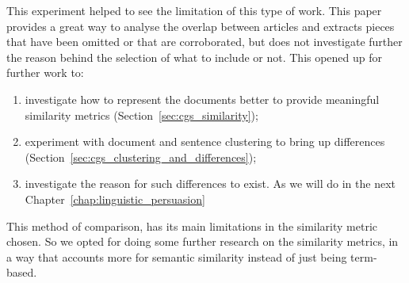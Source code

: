 
This experiment helped to see the limitation of this type of work.%
This paper provides a great way to analyse the overlap between articles and extracts pieces that have been omitted or that are corroborated, but does not investigate further the reason behind the selection of what to include or not.
This opened up for further work to:
\begin{enumerate}
    \item investigate how to represent the documents better to provide meaningful similarity metrics (Section~\ref{sec:cgs_similarity});
    \item experiment with document and sentence clustering to bring up differences (Section~\ref{sec:cgs_clustering_and_differences});
    \item investigate the reason for such differences to exist. As we will do in the next Chapter~\ref{chap:linguistic_persuasion}
\end{enumerate}

This method of comparison, has its main limitations in the similarity metric chosen. So we opted for doing some further research on the similarity metrics, in a way that accounts more for semantic similarity instead of just being term-based.


